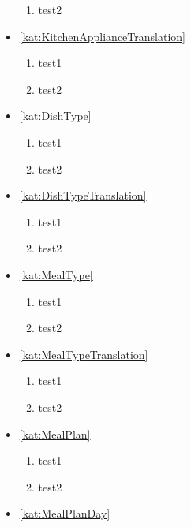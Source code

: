 \begin{itemize}[label={\textbf{Reguły dla}}, wide, labelwidth=!, labelindent=0pt]
\begin{enumerate}[label={\textbf{REG/\protect\threedigits{\arabic{enumi}}}}, wide, labelwidth=!, resume]
        \item test2
    \end{enumerate}
    \item\ref{kat:KitchenApplianceTranslation}
    \begin{enumerate}[label={\textbf{REG/\protect\threedigits{\arabic{enumi}}}}, wide, labelwidth=!, resume]
        \item test1
        \item test2
    \end{enumerate}
    \item\ref{kat:DishType}
    \begin{enumerate}[label={\textbf{REG/\protect\threedigits{\arabic{enumi}}}}, wide, labelwidth=!, resume]
        \item test1
        \item test2
    \end{enumerate}
    \item\ref{kat:DishTypeTranslation}
    \begin{enumerate}[label={\textbf{REG/\protect\threedigits{\arabic{enumi}}}}, wide, labelwidth=!, resume]
        \item test1
        \item test2
    \end{enumerate}
    \item\ref{kat:MealType}
    \begin{enumerate}[label={\textbf{REG/\protect\threedigits{\arabic{enumi}}}}, wide, labelwidth=!, resume]
        \item test1
        \item test2
    \end{enumerate}
    \item\ref{kat:MealTypeTranslation}
    \begin{enumerate}[label={\textbf{REG/\protect\threedigits{\arabic{enumi}}}}, wide, labelwidth=!, resume]
        \item test1
        \item test2
    \end{enumerate}
    \item\ref{kat:MealPlan}
    \begin{enumerate}[label={\textbf{REG/\protect\threedigits{\arabic{enumi}}}}, wide, labelwidth=!, resume]
        \item test1
        \item test2
    \end{enumerate}
    \item\ref{kat:MealPlanDay}

\end{itemize}
